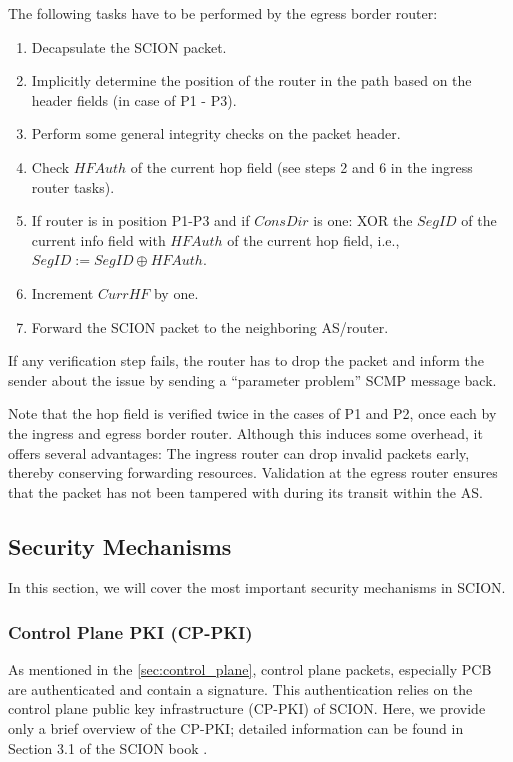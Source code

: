 The following tasks have to be performed by the egress border router:
\begin{enumerate}
    \item Decapsulate the SCION packet.
    \item Implicitly determine the position of the router in the path based on the header fields (in case of P1 - P3).
    \item Perform some general integrity checks on the packet header.
    \item Check $HFAuth$ of the current hop field (see steps 2 and 6 in the ingress router tasks).
    \item If router is in position P1-P3 and if $ConsDir$ is one: XOR the $SegID$ of the current info field with $HFAuth$ of the current hop field, i.e., $SegID := SegID \oplus HFAuth$.
    \item Increment $CurrHF$ by one.
    \item Forward the SCION packet to the neighboring AS/router.
\end{enumerate}


If any verification step fails, the router has to drop the packet and inform the sender about the issue by sending a ``parameter problem'' SCMP message back.

Note that the hop field is verified twice in the cases of P1 and P2, once each by the ingress and egress border router.
Although this induces some overhead, it offers several advantages:
The ingress router can drop invalid packets early, thereby conserving forwarding resources.
Validation at the egress router ensures that the packet has not been tampered with during its transit within the AS.


\subsection{Security Mechanisms}
In this section, we will cover the most important security mechanisms in SCION.


\subsubsection{Control Plane PKI (CP-PKI)}
\label{sec:cp_pki}
As mentioned in the \cref{sec:control_plane}, control plane packets, especially PCB are authenticated and contain a signature.
This authentication relies on the control plane public key infrastructure (CP-PKI) of SCION.
Here, we provide only a brief overview of the CP-PKI; detailed information can be found in Section 3.1 of the SCION book \cite{Perrig2022}.

